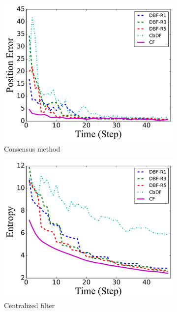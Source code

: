 \begin{figure}
		\begin{subfigure}[b]{0.23\textwidth}
			\includegraphics[width=\textwidth]{figures/hetero_mov_sen_mov_tar_pos_err_noise_sin}
			\caption{Consensus method}\label{fig:sin_pos_err}
		\end{subfigure}
		\begin{subfigure}[b]{0.23\textwidth}
			\includegraphics[width=\textwidth]{figures/hetero_mov_sen_mov_tar_entropy_noise_linear}
			\caption{Centralized filter}\label{fig:lin_ent}
		\end{subfigure}	
		\begin{subfigure}[b]{0.23\textwidth}

\end{subfigure}
\end{figure}
